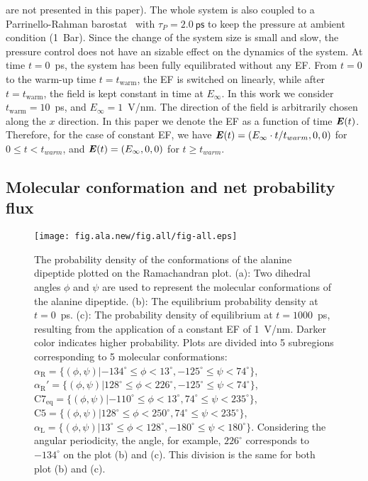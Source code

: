 \documentclass[a4paper,preprint,unsortedaddress,onecolumn]{revtex4-1}
\newcommand{\vect}[1]{\textbf{\textit{#1}}}
\newcommand{\confaa}[0]{{\alpha_{\textrm{R}}}}
\newcommand{\confab}[0]{{\alpha_{\textrm{R}}'}}
\newcommand{\confba}[0]{{\textrm{C}7_{\textrm{eq}}}}
\newcommand{\confbb}[0]{{\textrm{C}5}}
\newcommand{\confc}[0]{{\alpha_{\textrm{L}}}}
\begin{document}
  are not presented in this paper).
The whole system is also coupled to a Parrinello-Rahman barostat~\cite{parrinello1981polymorphic} with $\tau_P = 2.0~\textsf{ps}$ to keep
the pressure at ambient condition (1~Bar). Since the
change of the system size is small and slow, the pressure control
does not have an sizable effect on the
dynamics of the system.
At time $t=0$~ps, the system
has been fully equilibrated without any EF. From $t=0$ to
the warm-up time $t=t_{\textrm{warm}}$, the EF is switched on linearly, while
after $t=t_{\textrm{warm}}$, the field is kept constant in time at
$E_{\infty}$.  In this work we consider $t_{\textrm{warm}} = 10$~ps,
and $E_{\infty} = 1$~V/nm.
The direction of the field is arbitrarily chosen along the
$x$ direction.
In this paper we denote the
EF as a function of time $\vect E(t)$.
Therefore, for the case of constant EF, we have
$\vect E(t) = (E_\infty\cdot t/t_{warm},0,0)$ for $0\leq t < t_{warm}$, and 
$\vect E(t) = (E_\infty,0,0)$
for $t \geq t_{warm}$.


\subsection{Molecular conformation and net probability flux}

\begin{figure}
  \centering
  \texttt{[image: fig.ala.new/fig.all/fig-all.eps]}
  \caption{
    The probability density of the conformations of the alanine dipeptide plotted on the Ramachandran plot.
    (a): Two dihedral angles
    $\phi$ and $\psi$ are used to represent the molecular conformations of the alanine dipeptide.
    (b): The equilibrium probability density 
    at $t=0$~\textsf{ps}. (c): The probability density of equilibrium at $t=1000$~\textsf{ps}, resulting from the application of a constant EF of 1~V/nm. Darker color
    indicates higher probability.
    Plots are divided into 5 subregions corresponding
    to 5 molecular conformations:
    $\confaa = \{(\phi, \psi) | -134^\circ \leq \phi <  13^\circ, -125^\circ \leq \psi < 74^\circ\}$,
    $\confab = \{(\phi, \psi) |  128^\circ \leq \phi < 226^\circ, -125^\circ \leq \psi < 74^\circ\}$,
    $\confba = \{(\phi, \psi) | -110^\circ \leq \phi <  13^\circ,   74^\circ \leq \psi < 235^\circ\}$,
    $\confbb = \{(\phi, \psi) |  128^\circ \leq \phi < 250^\circ,   74^\circ \leq \psi < 235^\circ\}$,
    $\confc   = \{(\phi, \psi) |   13^\circ \leq \phi < 128^\circ, -180^\circ \leq \psi < 180^\circ\}$.
    Considering the angular periodicity, the angle, for example, $226^\circ$ corresponds to $-134^\circ$
    on the plot (b) and (c).
    This division is the same for both plot (b) and (c).
  }
  \label{fig:tmp4}
\end{figure}
\end{document}
